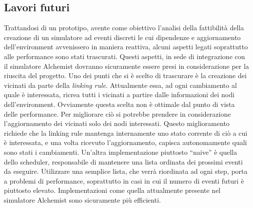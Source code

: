 \documentclass[12pt,a4paper,openright,twoside]{book}
\begin{document}
\subsection{Lavori futuri}
Trattandosi di un prototipo, avente come obiettivo l'analisi della fattibilità della creazione di un simulatore ad eventi discreti le cui dipendenze e aggiornamento dell'environment avvenissero in maniera reattiva, alcuni aspetti legati soprattutto alle performance sono stati trascurati. Questi aspetti, in sede di integrazione con il simulatore Alchemist dovranno sicuramente essere presi in considerazione per la riuscita del progetto. 
Uno dei punti che si è scelto di trascurare è la creazione dei vicinati da parte della \textit{linking rule}. Attualmente essa, ad ogni cambiamento al quale è interessata, ricrea tutti i vicinati a partire dalle informazioni dei nodi dell'environment. Ovviamente questa scelta non è ottimale dal punto di vista delle performance. Per migliorare ciò si potrebbe prendere in considerazione l'aggiornamento dei vicinati solo dei nodi interessati. Questo miglioramento richiede che la linking rule mantenga internamente uno stato corrente di ciò a cui è interessata, e una volta ricevuto l'aggiornamento, capisca autonomamente quali sono stati i cambiamenti. 
Un'altra implementazione piuttosto ``naive'' è quella dello scheduler, responsabile di mantenere una lista ordinata dei prossimi eventi da eseguire. 
Utilizzare una semplice lista, che verrà riordinata ad ogni step, porta a problemi di performance, soprattutto in casi in cui il numero di eventi futuri è piuttosto elevato. 
Implementazioni come quella attualmente presente nel simulatore Alchemist sono sicuramente più efficienti. 


\end{document}
